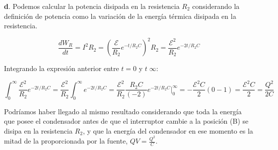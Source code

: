 \vspace{20px}
\textbf{d}. Podemos calcular la potencia disipada en la resistencia $R_2$ considerando la definición de potencia como la variación
de la energía térmica disipada en la resistencia.

\begin{equation*}
    \frac{d W_{R}}{dt} = I^2 R_2 = \left( \frac{\mathcal{E}}{R_2} e^{-t/R_2 C} \right)^2 R_2 = \frac{\mathcal{E}^2}{R_2}  e^{-2t/R_2 C}
\end{equation*}

Integrando la expresión anterior entre $t = 0$ y $t\;$\rightarrow$ \infty$:

\begin{equation*}
    \int_0^{\infty} \frac{\mathcal{E}^2}{R_2}  e^{-2t/R_2 C} =
    \frac{\mathcal{E}^2}{R_2} \int_0^{\infty}  e^{-2t/R_2 C} =
    \frac{\mathcal{E}^2}{R_2} \frac{R_2 C}{(-2)} e^{-2t/R_2 C} \Big|_0^\infty =
    - \frac{\mathcal{E}^2 C}{2}(0 - 1) = \frac{\mathcal{E}^2 C}{2} = \frac{Q^2}{2 C}
\end{equation*}

Podríamos haber llegado al mismo resultado considerando que toda la energía que posee el condensador antes de que el interruptor
cambie a la posición (B) se disipa en la resistencia $R_2$, y que la energía del condensador en ese momento es la mitad de la proporcionada
por la fuente, $QV = \frac{Q^2}{C}$.